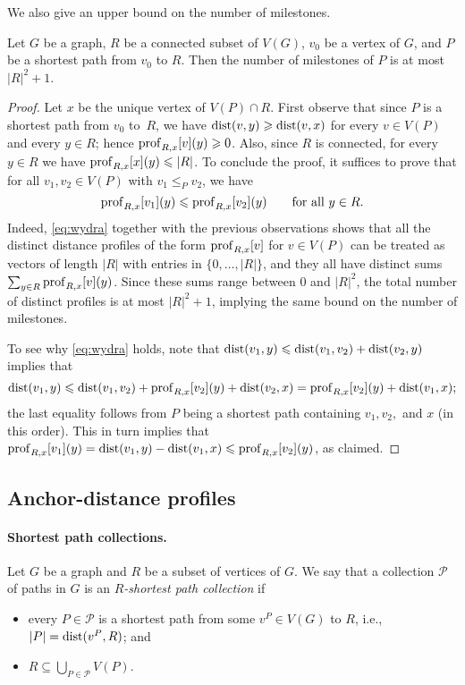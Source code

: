 We also give an upper bound on the number of milestones.

\begin{lemma}
  \label{lem:mile}
  Let $G$ be a graph, $R$ be a connected subset of $V(G)$, $v_0$ be a vertex of $G$, and $P$ be a shortest path from $v_0$ to $R$. Then the number of milestones of $P$ is at most $|R|^2+1$.
\end{lemma}
\begin{proof}
  Let $x$ be the unique vertex of $V(P)\cap R$.
  First observe that since $P$ is a shortest path from $v_0$ to~$R$, we have $\mathrm{dist}(v,y)\geqslant \mathrm{dist}(v,x)$ for every $v\in V(P)$ and every $y\in R$; hence $\mathrm{prof}_{R,x}[v](y)\geqslant 0$.
  Also, since $R$ is connected, for every $y\in R$ we have $\mathrm{prof}_{R,x}[x](y)\leqslant |R|$.
  To conclude the proof, it suffices to prove that for all $v_1,v_2\in V(P)$ with $v_1\leq_P v_2$, we have \begin{equation}\label{eq:wydra}\mathrm{prof}_{R,x}[v_1](y)\leqslant \mathrm{prof}_{R,x}[v_2](y)\qquad\textrm{for all }y\in R.\end{equation}
  Indeed, \eqref{eq:wydra} together with the previous observations shows that all the distinct distance profiles of the form $\mathrm{prof}_{R,x}[v]$ for $v\in V(P)$ can be treated as vectors of length $|R|$ with entries in $\{0,\ldots,|R|\}$, and they all have distinct sums $\sum_{y\in R} \mathrm{prof}_{R,x}[v](y)$. Since these sums range between $0$ and $|R|^2$, the total number of distinct profiles is at most $|R|^2+1$, implying the same bound on the number of milestones.

  To see why \eqref{eq:wydra} holds, note that $\mathrm{dist}(v_1,y)\leqslant \mathrm{dist}(v_1,v_2)+\mathrm{dist}(v_2,y)$ implies that $$\mathrm{dist}(v_1,y)\leqslant \mathrm{dist}(v_1,v_2)+\mathrm{prof}_{R,x}[v_2](y)+\mathrm{dist}(v_2,x)=\mathrm{prof}_{R,x}[v_2](y) + \mathrm{dist}(v_1,x);$$
  the last equality follows from $P$ being a shortest path containing $v_1,v_2,$ and $x$ (in this order). This in turn implies that
  $\mathrm{prof}_{R,x}[v_1](y)=\mathrm{dist}(v_1,y)-\mathrm{dist}(v_1,x)\leqslant \mathrm{prof}_{R,x}[v_2](y)$, as claimed.
\end{proof}


\subsection{Anchor-distance profiles}
\label{subsec:mdprofiles}

\paragraph{Shortest path collections.}
Let $G$ be a graph and $R$ be a subset of vertices of $G$.
We say that a collection $\mathcal{P}$ of paths in $G$
is an \emph{$R$-shortest path collection} if
\begin{itemize}[nosep]
  \item every $P \in \mathcal{P}$ is a shortest path from some $v^P \in V(G)$ to $R$, i.e., $|P|=\mathrm{dist}(v^P,R)$; and
  \item $R \subseteq \bigcup_{P \in \mathcal{P}} V(P)$.
\end{itemize}

